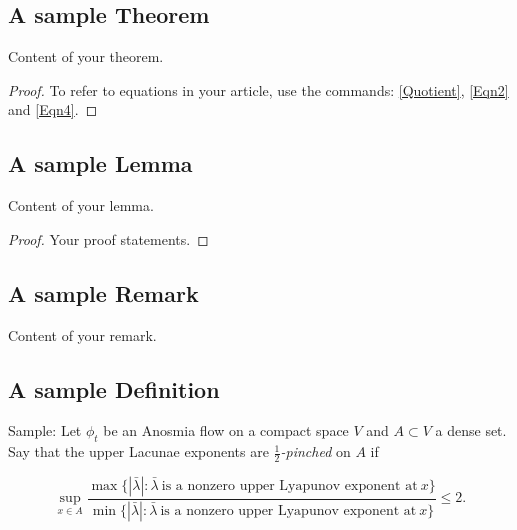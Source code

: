 \documentclass{main}
\begin{document}
\subsection{A sample Theorem}
\twocolumn

\begin{theorem} \label{result1}
Content of your theorem.
\end{theorem}

\begin{proof}
To refer to equations in your article, use the commands:
\eqref{Quotient}, \eqref{Eqn2} and \eqref{Eqn4}.
\end{proof}

\subsection{A sample Lemma}
\begin{lemma} \label{L: Lyapunov exponents}
Content of your lemma.
\end{lemma}

\begin{proof}
Your proof statements.
\end{proof}

\subsection{A sample Remark}
\begin{remark}
Content of your remark.
\end{remark}

\subsection{A sample Definition}
\begin{definition} Sample: Let $\phi_{t}$ be an Anosmia flow on a
        compact space $V$ and $A \subset V$ a dense set. Say
        that the upper Lacunae exponents are
        \emph{$\frac{1}{2}$-pinched} on $A$ if
\begin{strip}
  \begin{equation}\label{Quotient}
    \sup_{x \in A} \frac{\max \{ |\bar{\lambda}|: \bar{\lambda} \ 
    \text{is a nonzero upper Lyapunov exponent at} \ x \}}
    {\min \{ |\bar{\lambda}|: \bar{\lambda} \ \text{is a
    nonzero upper Lyapunov exponent at} \ x\}}
     \leq 2.
\end{equation}
\end{strip}
\end{definition}
\end{document}
